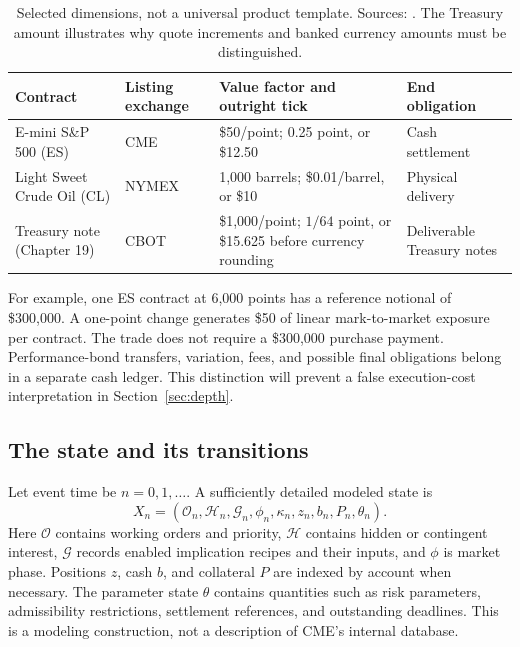 \begin{table}[htbp]
\centering\small
\begin{tabularx}{\textwidth}{@{}lXXX@{}}
\toprule
Contract & Listing exchange & Value factor and outright tick & End obligation\\
\midrule
E-mini S\&P 500 (ES) & CME & \$50/point; 0.25 point, or \$12.50 & Cash settlement\\
Light Sweet Crude Oil (CL) & NYMEX & 1,000 barrels; \$0.01/barrel, or \$10 & Physical delivery\\
Treasury note (Chapter 19) & CBOT & \$1,000/point; $1/64$ point, or \$15.625 before currency rounding & Deliverable Treasury notes\\
\bottomrule
\end{tabularx}
\caption{Selected dimensions, not a universal product template. Sources: \citet{CME358,NYMEX200,CBOT19}. The Treasury amount illustrates why quote increments and banked currency amounts must be distinguished.}
\label{tab:contracts}
\end{table}

For example, one ES contract at 6,000 points has a reference notional of \$300,000. A one-point change generates \$50 of linear mark-to-market exposure per contract. The trade does not require a \$300,000 purchase payment. Performance-bond transfers, variation, fees, and possible final obligations belong in a separate cash ledger. This distinction will prevent a false execution-cost interpretation in Section~\ref{sec:depth}.

\subsection{The state and its transitions}

Let event time be $n=0,1,\ldots$. A sufficiently detailed modeled state is
\begin{equation}
 X_n=(\mathcal O_n,\mathcal H_n,\mathcal G_n,\phi_n,
       \kappa_n,z_n,b_n,P_n,\theta_n).
\label{eq:state}
\end{equation}
Here $\mathcal O$ contains working orders and priority, $\mathcal H$ contains hidden or contingent interest, $\mathcal G$ records enabled implication recipes and their inputs, and $\phi$ is market phase. Positions $z$, cash $b$, and collateral $P$ are indexed by account when necessary. The parameter state $\theta$ contains quantities such as risk parameters, admissibility restrictions, settlement references, and outstanding deadlines. This is a modeling construction, not a description of CME's internal database.


